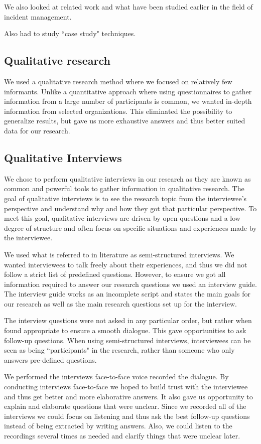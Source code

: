 We also looked at related work and what have been studied earlier in the field of incident management. 

Also had to study ``case study" techniques.

\subsection{Qualitative research}
We used a qualitative research method where we focused on relatively few informants. Unlike a quantitative approach where using questionnaires to gather information from a large number of participants is common, we wanted in-depth information from selected organizations. This eliminated the possibility to generalize results, but gave us more exhaustive answers and thus better suited data for our research.

\subsection{Qualitative Interviews}
We chose to perform qualitative interviews in our research as they are known as common and powerful tools to gather information in qualitative research\cite{myers2007qualitative}. The goal of qualitative interviews is to see the research topic from the interviewee's perspective and understand why and how they got that particular perspective\cite{cassell2004essential}. To meet this goal, qualitative interviews are driven by open questions and a low degree of structure and often focus on specific situations and experiences made by the interviewee. 

We used what is referred to in literature as semi-structured interviews\cite{cassell2004essential}. We wanted interviewees to talk freely about their experiences, and thus we did not follow a strict list of predefined questions. However, to ensure we got all information required to answer our research questions we used an interview guide. The interview guide works as an incomplete script and states the main goals for our research as well as the main research questions set up for the interview.

The interview questions were not asked in any particular order, but rather when found appropriate to ensure a smooth dialogue. This gave opportunities to ask follow-up questions. When using semi-structured interviews, interviewees can be seen as being ``participants" in the research, rather than someone who only answers pre-defined questions.

We performed the interviews face-to-face voice recorded the dialogue. By conducting interviews face-to-face we hoped to build trust with the interviewee and thus get better and more elaborative answers. It also gave us opportunity to explain and elaborate questions that were unclear. Since we recorded all of the interviews we could focus on listening and thus ask the best follow-up questions instead of being extracted by writing answers. Also, we could listen to the recordings several times as needed and clarify things that were unclear later.


